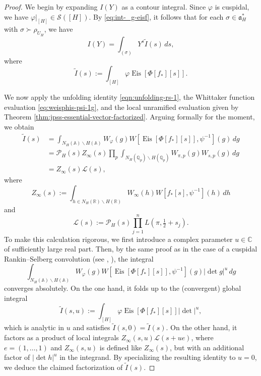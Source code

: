 \documentclass[reqno]{amsart}
\DeclareMathOperator{\Eis}{Eis}
\theoremstyle{plain} \newtheorem{theorem} {Theorem}
\theoremstyle{definition} \newtheorem{definition} [theorem] {Definition}
\theoremstyle{itplain} %
\numberwithin{equation}{section}
\numberwithin{theorem}{section}
\begin{document}
\begin{proof}
  We begin by expanding $I(Y)$ as a contour integral.  Since $\varphi$ is cuspidal, we have $\varphi|_{[H]} \in \mathcal{S}([H])$.  By \eqref{eq:int-_g-eisf}, it follows that for each $\sigma \in \mathfrak{a}_H^*$ with $\sigma \succ \rho_{U_H}$, we have
  \begin{equation}\label{eq:iy-=-int_c}
    I(Y)
    =
    \int_{(\sigma)}
    Y^{s}
    \tilde{I}(s)
    \, d s,
  \end{equation}
  where 
  \[
    \tilde{I}(s) := \int_{[H]} \varphi \Eis[\Phi[f_{\ast}][s]].
  \]
  
  We now apply the unfolding identity \eqref{eqn:unfolding-rs-1}, the Whittaker function evaluation \eqref{eq:weisphis-psi-1g}, and the local unramified evaluation given by Theorem \ref{thm:jpss-essential-vector-factorized}.  Arguing formally for the moment, we obtain
  \begin{align*}
    \nonumber
    \tilde{I}(s)
    &= \int _{N_H(\mathbb{A}) \backslash H(\mathbb{A})} W_\varphi(g) W[\Eis[\Phi[f_{\ast}][s]], \psi^{-1}](g) \, d g \\
    \nonumber
    &=
      \mathcal{P}_H(s) Z_\infty(s)
      \prod_p
      \int _{N_H(\mathbb{Q}_p) \backslash H(\mathbb{Q}_p)} W_{\pi,p}(g) W_{s,p}(g) \, d g \\
    &=
      Z_\infty(s) \mathcal{L}(s),
  \end{align*}
  where
  \[
    Z_\infty(s)
    :=
    \int_{h \in N_H(\mathbb{R}) \backslash H(\mathbb{R})}
    W_{\infty}(h) W[f_{\ast}[s], \psi^{-1}](h) \, d h
\]
and
\[
  \mathcal{L}(s) :=
  \mathcal{P}_H(s)
  \prod_{j=1}^n L(\pi, \tfrac{1}{2} + s_j).
\]
To make this calculation  rigorous, we first introduce a complex parameter $u \in \mathbb{C}$ of sufficiently large real part.  Then, by the same proof as in the case of a cuspidal Rankin--Selberg convolution (see \cite[\S2.2.2]{MR2508768}, \cite[\S13]{MR528964}), the integral
\begin{equation*}
  \int _{N_H(\mathbb{A}) \backslash H(\mathbb{A})} W_\varphi(g) W[\Eis[\Phi[f_{\ast}][s]], \psi^{-1}](g) |\det g|^u \, d g
\end{equation*}
converges absolutely.  On the one hand, it folds up to the (convergent) global integral
\begin{equation*}
\tilde{I}(s,u) := \int _{[H]} \varphi \Eis[\Phi[f_{\ast}][s]] |\det|^u,
\end{equation*}
which is analytic in $u$ and satisfies $\tilde{I}(s,0) = \tilde{I}(s)$.  On the other hand, it factors as a product of local integrals $Z_\infty(s,u) \mathcal{L}(s + u e)$, where $e = (1,\dotsc,1)$ and $Z_\infty(s,u)$ is defined like $Z_\infty(s)$, but with an additional factor of $|\det h|^u$ in the integrand.  By specializing the resulting identity to $u=0$, we deduce the claimed factorization of $\tilde{I}(s)$.


\end{proof}
\end{document}
